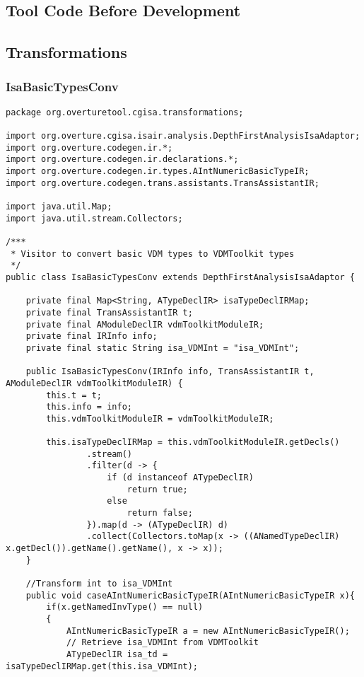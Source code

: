 \begin{appendices}
\chapter{Tool Code Before Development} \label{beforecode}
\section{Transformations} \label{transformationsbefore}

\subsection{IsaBasicTypesConv} \label{IsaBasicTypesConvbefore}
\begin{lstlisting}
package org.overturetool.cgisa.transformations;

import org.overture.cgisa.isair.analysis.DepthFirstAnalysisIsaAdaptor;
import org.overture.codegen.ir.*;
import org.overture.codegen.ir.declarations.*;
import org.overture.codegen.ir.types.AIntNumericBasicTypeIR;
import org.overture.codegen.trans.assistants.TransAssistantIR;

import java.util.Map;
import java.util.stream.Collectors;

/***
 * Visitor to convert basic VDM types to VDMToolkit types
 */
public class IsaBasicTypesConv extends DepthFirstAnalysisIsaAdaptor {

    private final Map<String, ATypeDeclIR> isaTypeDeclIRMap;
    private final TransAssistantIR t;
    private final AModuleDeclIR vdmToolkitModuleIR;
    private final IRInfo info;
    private final static String isa_VDMInt = "isa_VDMInt";

    public IsaBasicTypesConv(IRInfo info, TransAssistantIR t, AModuleDeclIR vdmToolkitModuleIR) {
        this.t = t;
        this.info = info;
        this.vdmToolkitModuleIR = vdmToolkitModuleIR;

        this.isaTypeDeclIRMap = this.vdmToolkitModuleIR.getDecls()
                .stream()
                .filter(d -> {
                    if (d instanceof ATypeDeclIR)
                        return true;
                    else
                        return false;
                }).map(d -> (ATypeDeclIR) d)
                .collect(Collectors.toMap(x -> ((ANamedTypeDeclIR) x.getDecl()).getName().getName(), x -> x));
    }

    //Transform int to isa_VDMInt
    public void caseAIntNumericBasicTypeIR(AIntNumericBasicTypeIR x){
        if(x.getNamedInvType() == null)
        {
            AIntNumericBasicTypeIR a = new AIntNumericBasicTypeIR();
            // Retrieve isa_VDMInt from VDMToolkit
            ATypeDeclIR isa_td = isaTypeDeclIRMap.get(this.isa_VDMInt);


\end{lstlisting}
\end{appendices}
